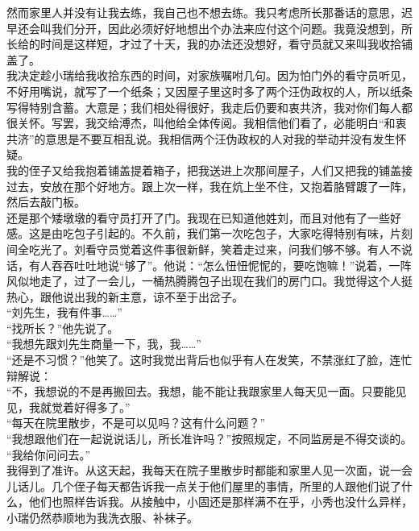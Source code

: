 然而家里人并没有让我去练，我自己也不想去练。我只考虑所长那番话的意思，迟早还会叫我们分开，因此必须好好地想出个办法来应付这个问题。我竟没想到，所长给的时间是这样短，才过了十天，我的办法还没想好，看守员就又来叫我收拾铺盖了。\\

我决定趁小瑞给我收拾东西的时间，对家族嘱咐几句。因为怕门外的看守员听见，不好用嘴说，就写了一个纸条；又因屋子里这时多了两个汪伪政权的人，所以纸条写得特别含蓄。大意是；我们相处得很好，我走后仍要和衷共济，我对你们每人都很关怀。写罢，我交给溥杰，叫他给全体传阅。我相信他们看了，必能明白“和衷共济”的意思是不要互相乱说。我相信两个汪伪政权的人对我的举动并没有发生怀疑。\\

我的侄子又给我抱着铺盖提着箱子，把我送进上次那间屋子，人们又把我的铺盖接过去，安放在那个好地方。跟上次一样，我在炕上坐不住，又抱着胳臂踱了一阵，然后去敲门板。\\

还是那个矮墩墩的看守员打开了门。我现在已知道他姓刘，而且对他有了一些好感。这是由吃包子引起的。不久前，我们第一次吃包子，大家吃得特别有味，片刻间全吃光了。刘看守员觉着这件事很新鲜，笑着走过来，问我们够不够。有人不说话，有人吞吞吐吐地说“够了”。他说：“怎么忸忸怩怩的，要吃饱嘛！”说着，一阵风似地走了，过了一会儿，一桶热腾腾包子出现在我们的房门口。我觉得这个人挺热心，跟他说出我的新主意，谅不至于出岔子。\\

“刘先生，我有件事……”\\

“找所长？”他先说了。\\

“我想先跟刘先生商量一下，我，我……”\\

“还是不习惯？”他笑了。这时我觉出背后也似乎有人在发笑，不禁涨红了脸，连忙辩解说：\\

“不，我想说的不是再搬回去。我想，能不能让我跟家里人每天见一面。只要能见见，我就觉着好得多了。”\\

“每天在院里散步，不是可以见吗？这有什么问题？”\\

“我想跟他们在一起说说话儿，所长准许吗？”按照规定，不同监房是不得交谈的。\\

“我给你问问去。”\\

我得到了准许。从这天起，我每天在院子里散步时都能和家里人见一次面，说一会儿话儿。几个侄子每天都告诉我一点关于他们屋里的事情，所里的人跟他们说了什么，他们也照样告诉我。从接触中，小固还是那样满不在乎，小秀也没什么异样，小瑞仍然恭顺地为我洗衣服、补袜子。\\

